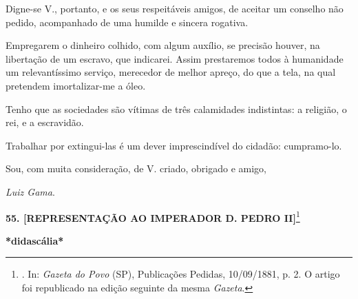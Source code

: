 Digne-se V., portanto, e os seus respeitáveis amigos, de aceitar um
conselho não pedido, acompanhado de uma humilde e sincera rogativa.

Empregarem o dinheiro colhido, com algum auxílio, se precisão houver, na
libertação de um escravo, que indicarei. Assim prestaremos todos à
humanidade um relevantíssimo serviço, merecedor de melhor apreço, do que
a tela, na qual pretendem imortalizar-me a óleo.

Tenho que as sociedades são vítimas de três calamidades indistintas: a
religião, o rei, e a escravidão.

Trabalhar por extingui-las é um dever imprescindível do cidadão:
cumpramo-lo.

Sou, com muita consideração, de V. criado, obrigado e amigo,

\emph{Luiz Gama}.

\textbf{55. {[}REPRESENTAÇÃO AO IMPERADOR D. PEDRO II{]}}\footnote{. In:
  \emph{Gazeta do Povo} (SP), Publicações Pedidas, 10/09/1881, p. 2. O
  artigo foi republicado na edição seguinte da mesma \emph{Gazeta}.}

\textbf{*didascália*}

